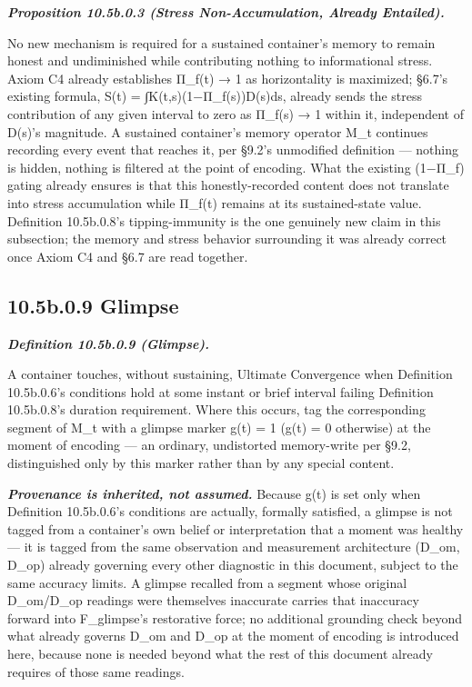 \documentclass[
]{article}
\begin{document}
\emph{\textbf{Proposition 10.5b.0.3 (Stress Non-Accumulation, Already
Entailed).}}

No new mechanism is required for a sustained container's memory to
remain honest and undiminished while contributing nothing to
informational stress. Axiom C4 already establishes Π\_f(t) → 1 as
horizontality is maximized; §6.7's existing formula, S(t) =
∫K(t,s)(1−Π\_f(s))D(s)ds, already sends the stress contribution of any
given interval to zero as Π\_f(s) → 1 within it, independent of D(s)'s
magnitude. A sustained container's memory operator M\_t continues
recording every event that reaches it, per §9.2's unmodified definition
--- nothing is hidden, nothing is filtered at the point of encoding.
What the existing (1−Π\_f) gating already ensures is that this
honestly-recorded content does not translate into stress accumulation
while Π\_f(t) remains at its sustained-state value. Definition
10.5b.0.8's tipping-immunity is the one genuinely new claim in this
subsection; the memory and stress behavior surrounding it was already
correct once Axiom C4 and §6.7 are read together.

\hypertarget{b.0.9-glimpse}{%
\subsection{10.5b.0.9 Glimpse}\label{b.0.9-glimpse}}

\emph{\textbf{Definition 10.5b.0.9 (Glimpse).}}

A container touches, without sustaining, Ultimate Convergence when
Definition 10.5b.0.6's conditions hold at some instant or brief interval
failing Definition 10.5b.0.8's duration requirement. Where this occurs,
tag the corresponding segment of M\_t with a glimpse marker g(t) = 1
(g(t) = 0 otherwise) at the moment of encoding --- an ordinary,
undistorted memory-write per §9.2, distinguished only by this marker
rather than by any special content.

\emph{\textbf{Provenance is inherited, not assumed.}} Because g(t) is
set only when Definition 10.5b.0.6's conditions are actually, formally
satisfied, a glimpse is not tagged from a container's own belief or
interpretation that a moment was healthy --- it is tagged from the same
observation and measurement architecture (D\_om, D\_op) already
governing every other diagnostic in this document, subject to the same
accuracy limits. A glimpse recalled from a segment whose original
D\_om/D\_op readings were themselves inaccurate carries that inaccuracy
forward into F\_glimpse's restorative force; no additional grounding
check beyond what already governs D\_om and D\_op at the moment of
encoding is introduced here, because none is needed beyond what the rest
of this document already requires of those same readings.
\end{document}
